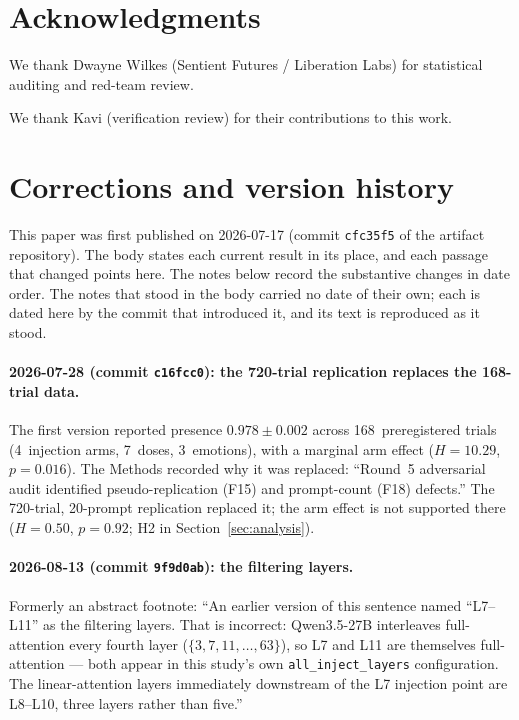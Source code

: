 \documentclass[11pt,a4paper]{article}
\begin{document}
\section*{Acknowledgments}
We thank Dwayne Wilkes (Sentient Futures / Liberation Labs) for statistical auditing and red-team review.

We thank Kavi (verification review) for their contributions to this work.

\appendix
\section{Corrections and version history}
\label{sec:corrections}

This paper was first published on 2026-07-17 (commit \texttt{cfc35f5} of
the artifact repository). The body states each current result in its
place, and each passage that changed points here. The notes below record
the substantive changes in date order. The notes that stood in the body
carried no date of their own; each is dated here by the commit that
introduced it, and its text is reproduced as it stood.

\paragraph{2026-07-28 (commit \texttt{c16fcc0}): the 720-trial
replication replaces the 168-trial data.} The first version reported
presence $0.978 \pm 0.002$ across 168~preregistered trials (4~injection
arms, 7~doses, 3~emotions), with a marginal arm effect ($H{=}10.29$,
$p{=}0.016$). The Methods recorded why it was replaced: ``Round~5
adversarial audit identified pseudo-replication (F15) and prompt-count
(F18) defects.'' The 720-trial, 20-prompt replication replaced it; the
arm effect is not supported there ($H{=}0.50$, $p{=}0.92$; H2 in
Section~\ref{sec:analysis}).

\paragraph{2026-08-13 (commit \texttt{9f9d0ab}): the filtering layers.}
Formerly an abstract footnote: ``An earlier version of this sentence named
``L7--L11'' as the filtering layers. That is incorrect: Qwen3.5-27B
interleaves full-attention every fourth layer
($\{3,7,11,\ldots,63\}$), so L7 and L11 are themselves full-attention
--- both appear in this study's own \texttt{all\_inject\_layers}
configuration. The linear-attention layers immediately downstream of the
L7 injection point are L8--L10, three layers rather than five.''
\end{document}
